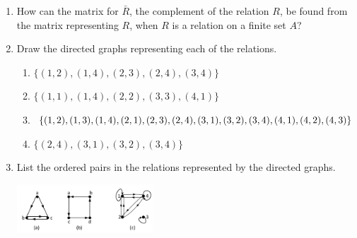 \documentclass{../../cls/sig-alternate-05-2015}
\begin{document}
\begin{enumerate}
\item How can the matrix for $\bar{R}$, the complement of the
relation $R$, be found from the matrix representing $R$,
when $R$ is a relation on a finite set $A$?

\item Draw the directed graphs representing each of the relations.
\begin{enumerate}
	\item $\{(1, 2), (1, 4), (2, 3), (2, 4), (3, 4)\}$
	\item $\{(1, 1), (1, 4), (2, 2), (3, 3), (4, 1)\}$
	\item $\{(1, 2), (1, 3), (1, 4), (2, 1), (2, 3), (2, 4),\\ (3, 1), (3, 2),
		(3, 4), (4, 1), (4, 2), (4, 3)\}$
	\item $\{(2, 4), (3, 1), (3, 2), (3, 4)\}$
\end{enumerate}

\item List the ordered pairs in the relations represented by the directed graphs.

	\includegraphics[width=0.4\textwidth]{figs/123.pdf}
\end{enumerate}
\end{document}
